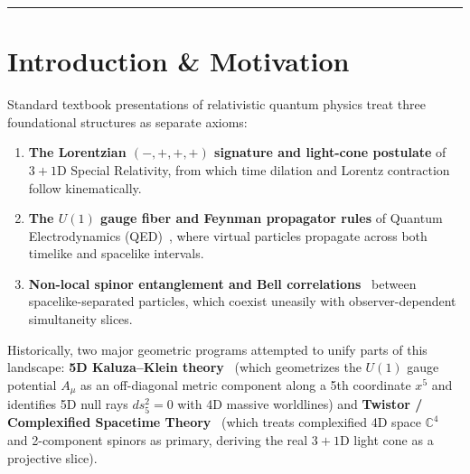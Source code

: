 \documentclass[11pt,a4paper]{article}
\begin{document}
\hrule
\vspace{1em}

\section{Introduction \& Motivation}

Standard textbook presentations of relativistic quantum physics treat three foundational structures as separate axioms:
\begin{enumerate}
    \item \textbf{The Lorentzian $(-,+,+,+)$ signature and light-cone postulate} of $3+1\text{D}$ Special Relativity, from which time dilation and Lorentz contraction follow kinematically.
    \item \textbf{The $U(1)$ gauge fiber and Feynman propagator rules} of Quantum Electrodynamics (QED)~\cite{Feynman1949}, where virtual particles propagate across both timelike and spacelike intervals.
    \item \textbf{Non-local spinor entanglement and Bell correlations}~\cite{Bell1964,Tsirelson1980} between spacelike-separated particles, which coexist uneasily with observer-dependent simultaneity slices.
\end{enumerate}

Historically, two major geometric programs attempted to unify parts of this landscape: \textbf{5D Kaluza--Klein theory}~\cite{Kaluza1921,Klein1926,Thiry1948,Wesson1999} (which geometrizes the $U(1)$ gauge potential $A_\mu$ as an off-diagonal metric component along a 5th coordinate $x^5$ and identifies 5D null rays $ds_5^2 = 0$ with 4D massive worldlines) and \textbf{Twistor / Complexified Spacetime Theory}~\cite{Penrose1967,PenroseRindler1984,Newman1976} (which treats complexified 4D space $\mathbb{C}^4$ and 2-component spinors as primary, deriving the real $3+1\text{D}$ light cone as a projective slice).
\end{document}
